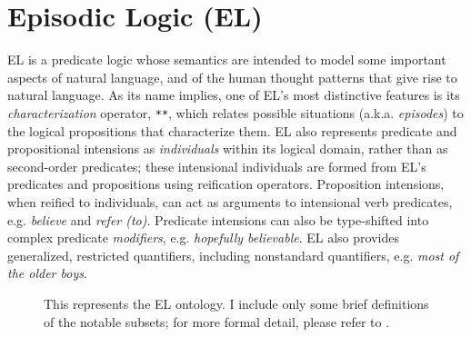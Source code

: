 \section{Episodic Logic (EL)}
\label{sec:el}

EL is a predicate logic whose semantics are intended to model some important aspects of natural language, and of the human thought patterns that give rise to natural language.  As its name implies, one of EL's most distinctive features is its \textit{characterization} operator, \texttt{**}, which relates possible situations (a.k.a. \textit{episodes}) to the logical propositions that characterize them. EL also represents predicate and propositional intensions as \textit{individuals} within its logical domain, rather than as second-order predicates; these intensional individuals are formed from EL's predicates and propositions using reification operators. Proposition intensions, when reified to individuals, can act as arguments to intensional verb predicates, e.g. \textit{believe} and \textit{refer (to)}. Predicate intensions can also be type-shifted into complex predicate \textit{modifiers}, e.g. \textit{hopefully believable}. EL also provides generalized, restricted quantifiers, including nonstandard quantifiers, e.g. \textit{most of the older boys}.

\begin{figure}
    

    \caption{This represents the EL ontology. I include only some brief definitions of the notable subsets; for more formal detail, please refer to \citep{schubert2000episodic}.}%
    \label{fig:el_ontology}
\end{figure}


